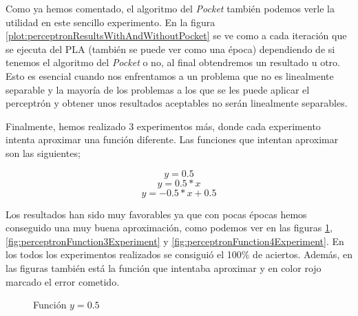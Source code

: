 Como ya hemos comentado, el algoritmo del \textit{Pocket} también podemos verle la utilidad en este sencillo experimento. En la figura \ref{plot:perceptronResultsWithAndWithoutPocket} se ve como a cada iteración que se ejecuta del PLA (también se puede ver como una época) dependiendo de si tenemos el algoritmo del \textit{Pocket} o no, al final obtendremos un resultado u otro. Esto es esencial cuando nos enfrentamos a un problema que no es linealmente separable y la mayoría de los problemas a los que se les puede aplicar el perceptrón y obtener unos resultados aceptables no serán linealmente separables.

\newpage
Finalmente, hemos realizado 3 experimentos más, donde cada experimento intenta aproximar una función diferente. Las funciones que intentan aproximar son las siguientes;

\[y=0.5\]
\[y=0.5*x\]
\[y=-0.5*x+0.5\]

Los resultados han sido muy favorables ya que con pocas épocas hemos conseguido una muy buena aproximación, como podemos ver en las figuras \ref{fig:perceptronFunction2Experiment}, \ref{fig:perceptronFunction3Experiment} y \ref{fig:perceptronFunction4Experiment}. En los todos los experimentos realizados se consiguió el 100\% de aciertos. Además, en las figuras también está la función que intentaba aproximar y en color rojo marcado el error cometido.

\begin{figure}[H]
    \centering
    
    
    \caption{Función $y=0.5$}
    \label{fig:perceptronFunction2Experiment}
\end{figure}

